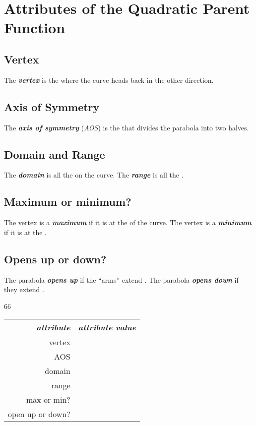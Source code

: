 \section{Attributes of the Quadratic Parent Function}

\subsection{Vertex}
The {\bfseries\itshape vertex} is the   
where the curve heads back in the other direction.

\subsection{Axis of Symmetry}
The {\bfseries\itshape axis of symmetry} ({\itshape AOS})
is the   
that divides the parabola into two  halves.

\subsection{Domain and Range} 
The {\bfseries\itshape domain} is all the  on the curve.
The {\bfseries\itshape range} is all the .

\subsection{Maximum or minimum?}
The vertex is a {\bfseries\itshape maximum} if it is at the  of the curve.
The vertex is a {\bfseries\itshape minimum} if it is at the .

\subsection{Opens up or down?}
The parabola {\bfseries\itshape opens up} if the ``arms'' extend .
The parabola {\bfseries\itshape opens down} if they extend .


\begin{minipage}{0.5\textwidth}
    \centering
    \begin{myTikzpictureGrid}{0.5} {6}{6}
    \end{myTikzpictureGrid}
\end{minipage}\begin{minipage}{0.5\textwidth}
    \centering 
    \renewcommand{\arraystretch}{1.75}
    \begin{tabular}{r|p{2in}}
        {\itshape attribute} & {\itshape attribute value} \\ \hline\hline
        vertex & \\ \hline
        AOS &    \\ \hline
        domain & \\ \hline
        range &  \\ \hline
        max or min? & \\ \hline
        open up or down? & \\ \hline
    \end{tabular}
\end{minipage}
